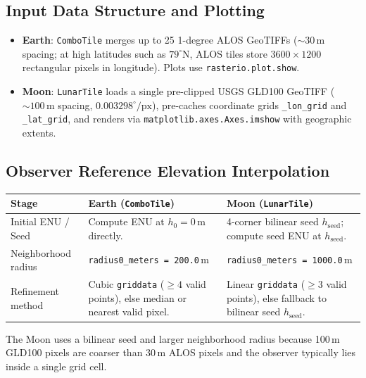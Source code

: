 \documentclass[11pt,letterpaper]{article}
\begin{document}
\subsection{Input Data Structure and Plotting}
\begin{itemize}
  \item \textbf{Earth}: \texttt{ComboTile} merges up to 25 1-degree ALOS GeoTIFFs ($\sim 30\,\text{m}$ spacing; at high latitudes such as $79^\circ\text{N}$, ALOS tiles store $3600\times 1200$ rectangular pixels in longitude). Plots use \texttt{rasterio.plot.show}.
  \item \textbf{Moon}: \texttt{LunarTile} loads a single pre-clipped USGS GLD100 GeoTIFF ($\sim 100\,\text{m}$ spacing, $0.003298^\circ/\text{px}$), pre-caches coordinate grids \texttt{\_lon\_grid} and \texttt{\_lat\_grid}, and renders via \texttt{matplotlib.axes.Axes.imshow} with geographic extents.
\end{itemize}

\subsection{Observer Reference Elevation Interpolation}
\begin{center}
\begin{tabular}{@{}p{3.6cm}p{5.5cm}p{5.5cm}@{}}
\toprule
\textbf{Stage} & \textbf{Earth (\texttt{ComboTile})} & \textbf{Moon (\texttt{LunarTile})} \\
\midrule
Initial ENU / Seed & Compute ENU at $h_0=0\,\text{m}$ directly. & 4-corner bilinear seed $h_{\mathrm{seed}}$; compute seed ENU at $h_{\mathrm{seed}}$. \\
Neighborhood radius & \texttt{radius0\_meters = 200.0}\,m & \texttt{radius0\_meters = 1000.0}\,m \\
Refinement method & Cubic \texttt{griddata} ($\ge 4$ valid points), else median or nearest valid pixel. & Linear \texttt{griddata} ($\ge 3$ valid points), else fallback to bilinear seed $h_{\mathrm{seed}}$. \\
\bottomrule
\end{tabular}
\end{center}
The Moon uses a bilinear seed and larger neighborhood radius because 100\,m GLD100 pixels are coarser than 30\,m ALOS pixels and the observer typically lies inside a single grid cell.
\end{document}
